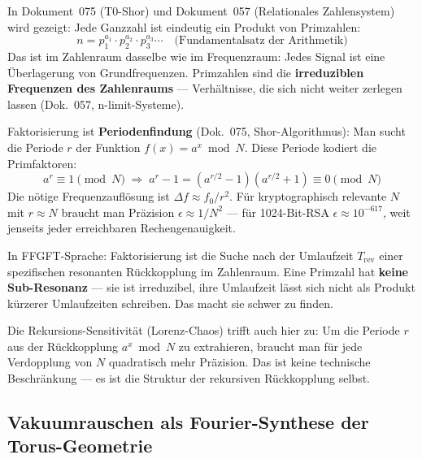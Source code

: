 In Dokument~075 (T0-Shor) und Dokument~057 (Relationales Zahlensystem) wird gezeigt:
Jede Ganzzahl ist eindeutig ein Produkt von Primzahlen:
\begin{equation}
    n = p_1^{a_1} \cdot p_2^{a_2} \cdot p_3^{a_3} \cdots
    \quad \text{(Fundamentalsatz der Arithmetik)}
\end{equation}
Das ist im Zahlenraum dasselbe wie im Frequenzraum: Jedes Signal ist eine Überlagerung
von Grundfrequenzen. Primzahlen sind die \textbf{irreduziblen Frequenzen des Zahlenraums}
— Verhältnisse, die sich nicht weiter zerlegen lassen (Dok.~057, n-limit-Systeme).

\begin{technical}
Faktorisierung ist \textbf{Periodenfindung} (Dok.~075, Shor-Algorithmus): Man sucht
die Periode $r$ der Funktion $f(x) = a^x \bmod N$. Diese Periode kodiert die
Primfaktoren:
\begin{equation}
    a^r \equiv 1 \pmod{N}
    \;\Rightarrow\;
    a^r - 1 = (a^{r/2}-1)(a^{r/2}+1) \equiv 0 \pmod{N}
\end{equation}
Die nötige Frequenzauflösung ist $\Delta f \approx f_0/r^2$. Für kryptographisch
relevante $N$ mit $r \approx N$ braucht man Präzision $\epsilon \approx 1/N^2$ —
für 1024-Bit-RSA $\epsilon \approx 10^{-617}$, weit jenseits jeder erreichbaren
Rechengenauigkeit.

In FFGFT-Sprache: Faktorisierung ist die Suche nach der Umlaufzeit $T_\text{rev}$
einer spezifischen resonanten Rückkopplung im Zahlenraum. Eine Primzahl hat
\textbf{keine Sub-Resonanz} — sie ist irreduzibel, ihre Umlaufzeit lässt sich
nicht als Produkt kürzerer Umlaufzeiten schreiben. Das macht sie schwer zu finden.

Die Rekursions-Sensitivität (Lorenz-Chaos) trifft auch hier zu: Um die Periode
$r$ aus der Rückkopplung $a^x \bmod N$ zu extrahieren, braucht man für jede
Verdopplung von $N$ quadratisch mehr Präzision. Das ist keine technische
Beschränkung — es ist die Struktur der rekursiven Rückkopplung selbst.
\end{technical}


\subsection{Vakuumrauschen als Fourier-Synthese der Torus-Geometrie}

